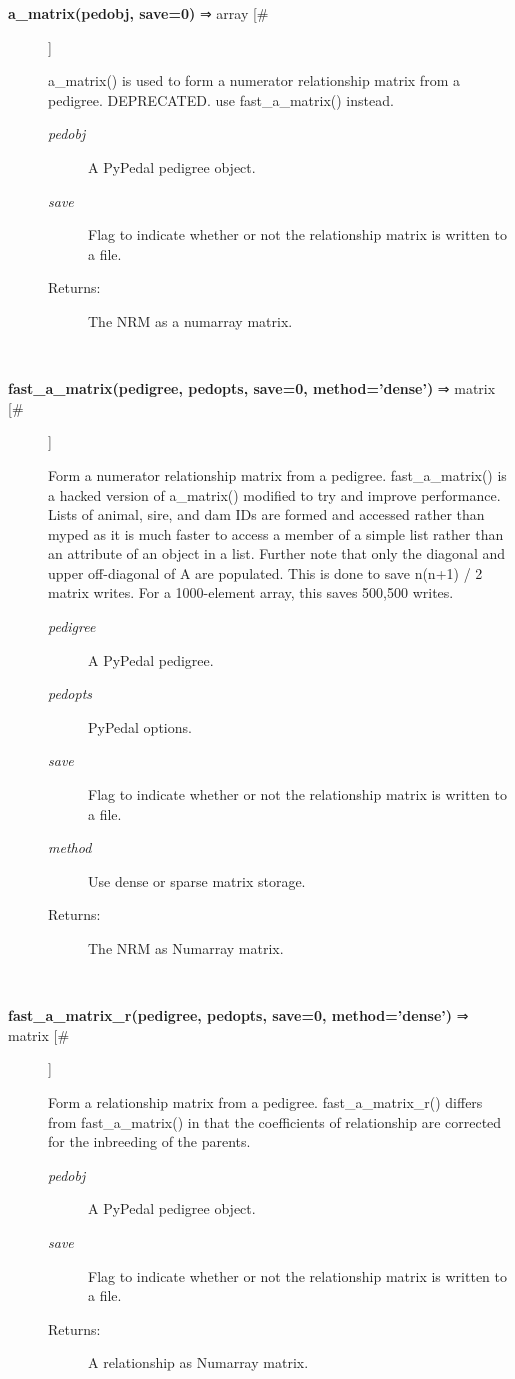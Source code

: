 \begin{description}
\item[\textbf{a\_matrix(pedobj, save=0)}
 ⇒ array [\#]]

 a\_matrix() is used to form a numerator relationship matrix from a pedigree. DEPRECATED. use fast\_a\_matrix() instead.
\begin{description}
\item[\emph{pedobj}
] A PyPedal pedigree object.
\item[\emph{save}
] Flag to indicate whether or not the relationship matrix is written to a file.
\item[Returns:] The NRM as a numarray matrix.

\end{description}
\\ 

\item[\textbf{fast\_a\_matrix(pedigree, pedopts, save=0, method='dense')}
 ⇒ matrix [\#]]

 Form a numerator relationship matrix from a pedigree. fast\_a\_matrix() is a hacked version of a\_matrix() modified to try and improve performance. Lists of animal, sire, and dam IDs are formed and accessed rather than myped as it is much faster to access a member of a simple list rather than an attribute of an object in a list. Further note that only the diagonal and upper off-diagonal of A are populated. This is done to save n(n+1) / 2 matrix writes. For a 1000-element array, this saves 500,500 writes.
\begin{description}
\item[\emph{pedigree}
] A PyPedal pedigree.
\item[\emph{pedopts}
] PyPedal options.
\item[\emph{save}
] Flag to indicate whether or not the relationship matrix is written to a file.
\item[\emph{method}
] Use dense or sparse matrix storage.
\item[Returns:] The NRM as Numarray matrix.

\end{description}
\\ 

\item[\textbf{fast\_a\_matrix\_r(pedigree, pedopts, save=0, method='dense')}
 ⇒ matrix [\#]]

 Form a relationship matrix from a pedigree. fast\_a\_matrix\_r() differs from fast\_a\_matrix() in that the coefficients of relationship are corrected for the inbreeding of the parents.
\begin{description}
\item[\emph{pedobj}
] A PyPedal pedigree object.
\item[\emph{save}
] Flag to indicate whether or not the relationship matrix is written to a file.
\item[Returns:] A relationship as Numarray matrix.


\end{description}
\end{description}
